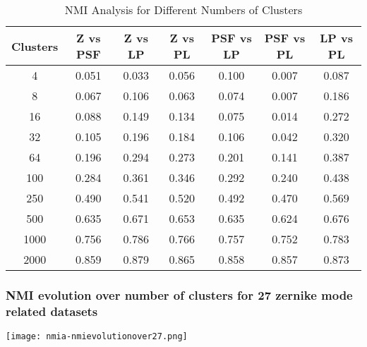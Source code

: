 \begin{table}[h!]
\centering
\begin{tabular}{|c|c|c|c|c|c|c|}
\hline
\textbf{Clusters} & \textbf{Z vs PSF} & \textbf{Z vs LP} & \textbf{Z vs PL} & \textbf{PSF vs LP} & \textbf{PSF vs PL} & \textbf{LP vs PL} \\
\hline
4   & 0.051 & 0.033 & 0.056 & 0.100 & 0.007 & 0.087 \\
8   & 0.067 & 0.106 & 0.063 & 0.074 & 0.007 & 0.186 \\
16  & 0.088 & 0.149 & 0.134 & 0.075 & 0.014 & 0.272 \\
32  & 0.105 & 0.196 & 0.184 & 0.106 & 0.042 & 0.320 \\
64  & 0.196 & 0.294 & 0.273 & 0.201 & 0.141 & 0.387 \\
100 & 0.284 & 0.361 & 0.346 & 0.292 & 0.240 & 0.438 \\
250 & 0.490 & 0.541 & 0.520 & 0.492 & 0.470 & 0.569 \\
500 & 0.635 & 0.671 & 0.653 & 0.635 & 0.624 & 0.676 \\
1000 & 0.756 & 0.786 & 0.766 & 0.757 & 0.752 & 0.783 \\
2000 & 0.859 & 0.879 & 0.865 & 0.858 & 0.857 & 0.873 \\
\hline
\end{tabular}
\caption{NMI Analysis for Different Numbers of Clusters}
\end{table}
		\FloatBarrier
		
		
	\subsubsection{NMI evolution over number of clusters for 27 zernike mode related datasets}
		\begin{figure*}[ht!]
			\centering
			\texttt{[image: nmia-nmievolutionover27.png]}
		\end{figure*}
		
